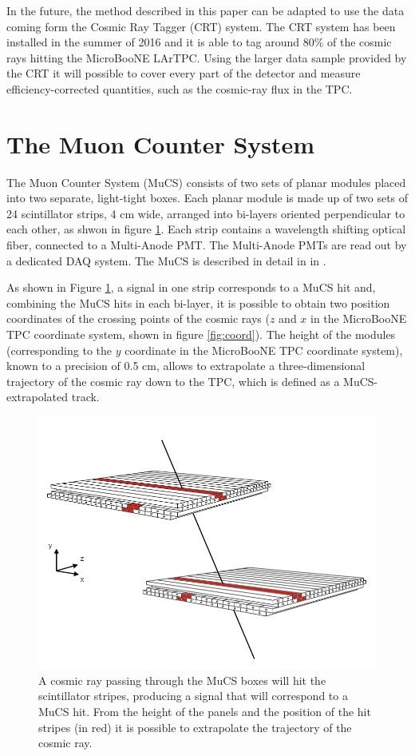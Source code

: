 \documentclass[a4paper,11pt]{article}
\begin{document}
In the future, the method described in this paper can be adapted to use the data coming form the Cosmic Ray Tagger (CRT) system\cite{crt}. The CRT system has been installed in the summer of 2016 and it is able to tag around 80\% of the cosmic rays hitting the MicroBooNE LArTPC. Using the larger data sample provided by the CRT it will possible to cover every part of the detector and measure efficiency-corrected quantities, such as the cosmic-ray flux in the TPC.


\section{The Muon Counter System}\label{sec:proc}
The Muon Counter System (MuCS) consists of two sets of planar modules placed into two separate, light-tight boxes. Each planar module is made up of two sets of 24 scintillator strips, 4 cm wide, arranged into bi-layers oriented perpendicular to each other, as shwon in figure \ref{fig:boxes}. Each strip contains a wavelength shifting optical fiber, connected to a Multi-Anode PMT. The Multi-Anode PMTs are read out by a dedicated DAQ system.
The MuCS is described in detail in in \cite{mucs}.

As shown in Figure \ref{fig:boxes}, a signal in one strip corresponds to a MuCS hit and, combining the MuCS hits in each bi-layer, it is possible to obtain two position coordinates of the crossing points of the cosmic rays ($z$ and $x$ in the MicroBooNE TPC coordinate system, shown in figure \ref{fig:coord}). The height of the modules (corresponding to the $y$ coordinate in the MicroBooNE TPC coordinate system), known to a precision of 0.5 cm, allows to extrapolate a three-dimensional trajectory of the cosmic ray down to the TPC, which is defined as a MuCS-extrapolated track.
\begin{figure}[htbp]
  \begin{center}
    \includegraphics[width=0.7\linewidth]{figures/boxes.png}
    \caption{A cosmic ray passing through the MuCS boxes will hit the scintillator stripes, producing a signal that will correspond to a MuCS hit. From the height of the panels and the position of the hit stripes (in red) it is possible to extrapolate the trajectory of the cosmic ray.} \label{fig:boxes}
  \end{center}
\end{figure}
\end{document}
